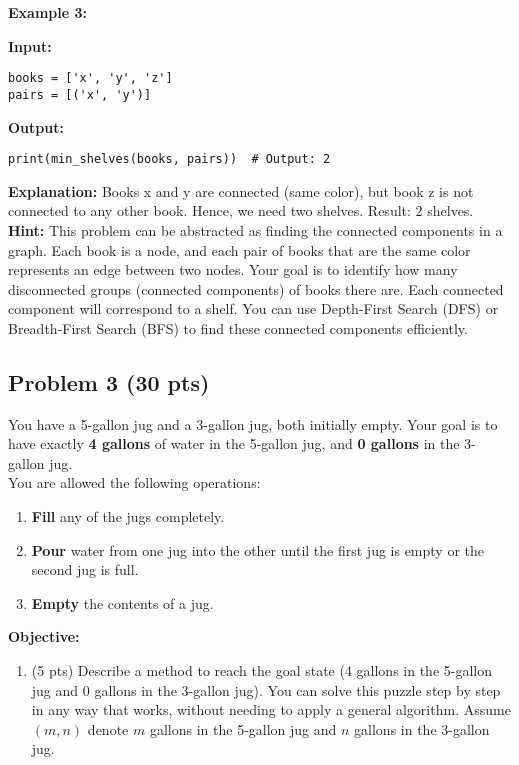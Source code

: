 \documentclass[12pt]{article}
\begin{document}
\begin{enumerate}
\vspace{1em}

\noindent \textbf{Example 3:}

\noindent \textbf{Input:}
\begin{verbatim}
books = ['x', 'y', 'z']
pairs = [('x', 'y')]
\end{verbatim}

\noindent \textbf{Output:}
\begin{verbatim}
print(min_shelves(books, pairs))  # Output: 2
\end{verbatim}

\noindent \textbf{Explanation:} Books x and y are connected (same color), but book z is not connected to any other book. Hence, we need two shelves. Result: 2 shelves.\\

\noindent \textbf{Hint:} This problem can be abstracted as finding the connected components in a graph. Each book is a node, and each pair of books that are the same color represents an edge between two nodes. Your goal is to identify how many disconnected groups (connected components) of books there are. Each connected component will correspond to a shelf. You can use Depth-First Search (DFS) or Breadth-First Search (BFS) to find these connected components efficiently.

\subsection*{Problem 3 (30 pts)}
You have a 5-gallon jug and a 3-gallon jug, both initially empty. Your goal is to have exactly \textbf{4 gallons} of water in the 5-gallon jug, and \textbf{0 gallons} in the 3-gallon jug.
\\

You are allowed the following operations:

\begin{enumerate}
    \item \textbf{Fill} any of the jugs completely.
    \item \textbf{Pour} water from one jug into the other until the first jug is empty or the second jug is full.
    \item \textbf{Empty} the contents of a jug.
\end{enumerate}

\noindent \textbf{Objective:}  
\begin{enumerate}
    \item (5 pts) Describe a method to reach the goal state (4 gallons in the 5-gallon jug and 0 gallons in the 3-gallon jug). You can solve this puzzle step by step in any way that works, without needing to apply a general algorithm. Assume $(m,n)$ denote $m$ gallons in the 5-gallon jug and $n$ gallons in the 3-gallon jug.
    

\end{enumerate}
\end{enumerate}
\end{document}
